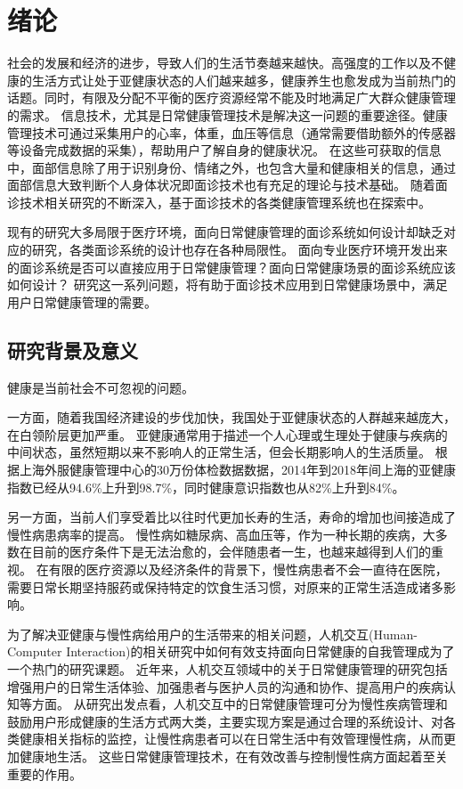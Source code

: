 \chapter{绪论}

社会的发展和经济的进步，导致人们的生活节奏越来越快。高强度的工作以及不健康的生活方式让处于亚健康状态的人们越来越多，健康养生也愈发成为当前热门的话题。同时，有限及分配不平衡的医疗资源经常不能及时地满足广大群众健康管理的需求\cite{雷鹏2019中国医疗资源配置与服务利用现状评价}。
信息技术，尤其是日常健康管理技术是解决这一问题的重要途径。健康管理技术可通过采集用户的心率，体重，血压等信息（通常需要借助额外的传感器等设备完成数据的采集），帮助用户了解自身的健康状况。
在这些可获取的信息中，面部信息除了用于识别身份、情绪之外，也包含大量和健康相关的信息，通过面部信息大致判断个人身体状况即面诊技术也有充足的理论与技术基础\cite{li2020tcminet}。
随着面诊技术相关研究的不断深入，基于面诊技术的各类健康管理系统也在探索中\cite{林锋2019中医面诊系统调研报告}。

现有的研究大多局限于医疗环境，面向日常健康管理的面诊系统如何设计却缺乏对应的研究，各类面诊系统的设计也存在各种局限性。
面向专业医疗环境开发出来的面诊系统是否可以直接应用于日常健康管理？面向日常健康场景的面诊系统应该如何设计？
研究这一系列问题，将有助于面诊技术应用到日常健康场景中，满足用户日常健康管理的需要。

\section{研究背景及意义}
健康是当前社会不可忽视的问题。

一方面，随着我国经济建设的步伐加快，我国处于亚健康状态的人群越来越庞大，在白领阶层更加严重。
亚健康通常用于描述一个人心理或生理处于健康与疾病的中间状态，虽然短期以来不影响人的正常生活，但会长期影响人的生活质量。
根据上海外服健康管理中心的30万份体检数据数据，2014年到2018年间上海的亚健康指数已经从94.6\%上升到98.7\%，同时健康意识指数也从82\%上升到84\%\cite{health_report2019}。

另一方面，当前人们享受着比以往时代更加长寿的生活，寿命的增加也间接造成了慢性病患病率的提高\cite{OlshanskyDEMOGRAPHY}。
慢性病如糖尿病、高血压等，作为一种长期的疾病，大多数在目前的医疗条件下是无法治愈的，会伴随患者一生，也越来越得到人们的重视\cite{blandford2019hci}。
在有限的医疗资源以及经济条件的背景下，慢性病患者不会一直待在医院，需要日常长期坚持服药或保持特定的饮食生活习惯，对原来的正常生活造成诸多影响\cite{lupton2017self-tracking}。

为了解决亚健康与慢性病给用户的生活带来的相关问题，人机交互(Human-Computer Interaction)的相关研究中如何有效支持面向日常健康的自我管理成为了一个热门的研究课题。
近年来，人机交互领域中的关于日常健康管理的研究包括增强用户的日常生活体验、加强患者与医护人员的沟通和协作、提高用户的疾病认知等方面。
从研究出发点看，人机交互中的日常健康管理可分为慢性疾病管理和鼓励用户形成健康的生活方式两大类，主要实现方案是通过合理的系统设计、对各类健康相关指标的监控，让慢性病患者可以在日常生活中有效管理慢性病，从而更加健康地生活。
这些日常健康管理技术，在有效改善与控制慢性病方面起着至关重要的作用\cite{ayobi2017quantifying}。

